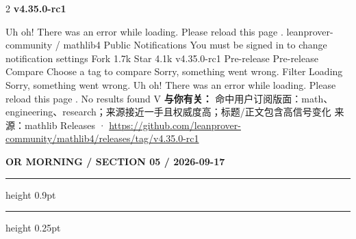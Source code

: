 \documentclass[10.5pt]{ctexart}
\begin{document}
\begin{multicols}{2}
{\large\bfseries v4.35.0-rc1}\par
Uh oh! There was an error while loading. Please reload this page . leanprover-community / mathlib4 Public Notifications You must be signed in to change notification settings Fork 1.7k Star 4.1k v4.35.0-rc1 Pre-release Pre-release Compare Choose a tag to compare Sorry, something went wrong. Filter Loading Sorry, something went wrong. Uh oh! There was an error while loading. Please reload this page . No results found V
\textbf{与你有关：} 命中用户订阅版面：math、engineering、research；来源接近一手且权威度高；标题/正文包含高信号变化
{\footnotesize\color{ormuted} 来源：mathlib Releases · \url{https://github.com/leanprover-community/mathlib4/releases/tag/v4.35.0-rc1}}
\end{multicols}
\newpage
{\small\bfseries OR MORNING / SECTION 05 / 2026-09-17}
\vspace{2mm}
\hrule height 0.9pt
\vspace{1.5mm}
\hrule height 0.25pt
\vspace{4mm}
\end{document}
